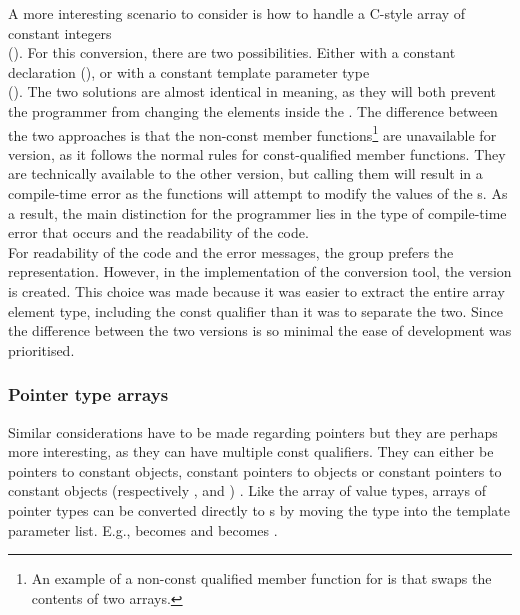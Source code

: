 A more interesting scenario to consider is how to handle a C-style array of constant integers\\
(). For this conversion, there are two possibilities. Either with a constant  declaration
(), or with a constant template parameter type\\
().
The two solutions are almost identical in meaning, as they will both prevent the programmer from changing the elements inside the .
The difference between the two approaches is that the non-const member functions\footnote{
    An example of a non-const qualified member function for  is  that swaps the contents of two arrays.
} are unavailable for  version, as it follows the normal rules for const-qualified member functions.
They are technically available to the other version, but calling them will result in a compile-time error as the functions will attempt to modify the values of the s.
As a result, the main distinction for the programmer lies in the type of compile-time error that occurs and the readability of the code.\\
For readability of the code and the error messages, the group prefers the  representation.
However, in the implementation of the conversion tool, the  version is created. This choice was made because it was easier to extract the entire array element type, including the const qualifier than it was to separate the two.
Since the difference between the two versions is so minimal the ease of development was prioritised.

\subsubsection*{Pointer type arrays}
Similar considerations have to be made regarding pointers but they are perhaps more interesting, as they can have multiple const qualifiers.
They can either be pointers to constant objects, constant pointers to objects or constant pointers to constant objects (respectively ,  and ) \cite{cppreferencePointerDeclarationCppreference}.
Like the array of value types, arrays of pointer types can be converted directly to s by moving the type into the template parameter list.
E.g.,  becomes  and  becomes .

